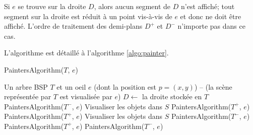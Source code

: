 

Si $e$ se trouve sur la droite $D$, alors aucun segment de $D$ n'est affiché;
tout segment sur la droite est réduit à un point vis-à-vis de $e$ et donc ne
doit être affiché. L'ordre de traitement des demi-plans $D^+$ et $D^-$ n'importe
pas dans ce cas.

L'algorithme est détaillé à l'algorithme \ref{algo:painter}.

\begin{algorithm}
  \caption{PaintersAlgorithm($T$, $e$)}
  \begin{algorithmic}[1] \label{algo:painter}
    \REQUIRE Un arbre BSP $T$ et un oeil $e$ (dont la position est $p=(x, y)$)
    \ENSURE -- (la scène représentée par $T$ est visualisée par $e$)
    \STATE $D\leftarrow$ la droite stockée en $T$
    \STATE PaintersAlgorithm($T^-$, $e$)
    \STATE Visualiser les objets dans $S$
    \STATE PaintersAlgorithm($T^+$, $e$)
    \STATE PaintersAlgorithm($T^+$, $e$)
    \STATE Visualiser les objets dans $S$
    \STATE PaintersAlgorithm($T^-$, $e$)
    \ELSE
    \STATE PaintersAlgorithm($T^+$, $e$)
    \STATE PaintersAlgorithm($T^-$, $e$)
    \ENDIF
    \ENDIF
  \end{algorithmic}
\end{algorithm}

